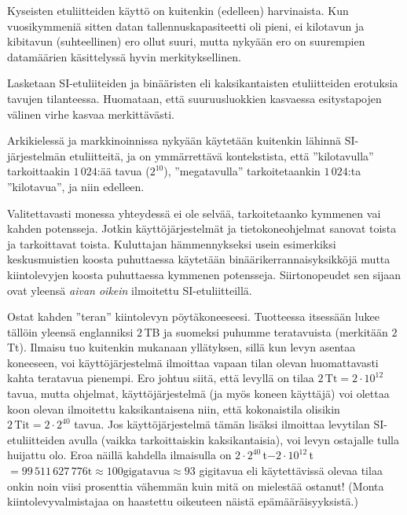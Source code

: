 Kyseisten etuliitteiden käyttö on kuitenkin (edelleen) harvinaista. Kun vuosikymmeniä sitten datan tallennuskapasiteetti oli pieni, ei kilotavun ja kibitavun (suhteellinen) ero ollut suuri, mutta nykyään ero on suurempien datamäärien käsittelyssä hyvin merkityksellinen. 

\begin{esimerkki}
Lasketaan SI-etuliiteiden ja binääristen eli kaksikantaisten etuliitteiden erotuksia tavujen tilanteessa.
Huomataan, että suuruusluokkien kasvaessa esitystapojen välinen virhe kasvaa merkittävästi.
\end{esimerkki}

Arkikielessä ja markkinoinnissa nykyään käytetään kuitenkin lähinnä SI-järjestelmän etuliitteitä, ja on ymmärrettävä kontekstista, että ''kilotavulla'' tarkoittaakin $1\,024$:ää tavua ($2^{10}$), ''megatavulla'' tarkoitetaankin $1\,024$:ta ''kilotavua'', ja niin edelleen.

Valitettavasti monessa yhteydessä ei ole selvää, tarkoitetaanko kymmenen vai kahden potensseja. Jotkin käyttöjärjestelmät ja tietokoneohjelmat sanovat toista ja tarkoittavat toista. Kuluttajan hämmennykseksi usein esimerkiksi keskusmuistien koosta puhuttaessa käytetään binäärikerrannaisyksikköjä mutta kiintolevyjen koosta puhuttaessa kymmenen potensseja. Siirtonopeudet sen sijaan ovat yleensä \textit{aivan oikein} ilmoitettu SI-etuliitteillä.

\begin{esimerkki}
Ostat kahden ''teran'' kiintolevyn pöytäkoneeseesi. Tuotteessa itsessään lukee tällöin yleensä englanniksi $2$\,TB ja suomeksi puhumme teratavuista (merkitään $2$\,Tt). Ilmaisu tuo kuitenkin mukanaan yllätyksen, sillä kun levyn asentaa koneeseen, voi käyttöjärjestelmä ilmoittaa vapaan tilan olevan huomattavasti kahta teratavua pienempi. Ero johtuu siitä, että levyllä on tilaa $2\,\textrm{Tt}=2\cdot 10^{12}$ tavua, mutta ohjelmat, käyttöjärjestelmä (ja myös koneen käyttäjä) voi olettaa koon olevan ilmoitettu kaksikantaisena niin, että kokonaistila olisikin $2\,\textrm{Tit}=2\cdot 2^{40}$ tavua. Jos käyttöjärjestelmä tämän lisäksi ilmoittaa levytilan SI-etuliitteiden avulla (vaikka tarkoittaiskin kaksikantaisia), voi levyn ostajalle tulla huijattu olo. Eroa näillä kahdella ilmaisulla on $2\cdot 2^{40}\,$t$-2\cdot 10^{12}\,$t$=99\,511\,627\,776\textrm{t}\approx 100 \text{gigatavua} \approx 93$ gigitavua eli käytettävissä olevaa tilaa onkin noin viisi prosenttia vähemmän kuin mitä on mielestää ostanut! (Monta kiintolevyvalmistajaa on haastettu oikeuteen näistä epämääräisyyksistä.)
\end{esimerkki}

